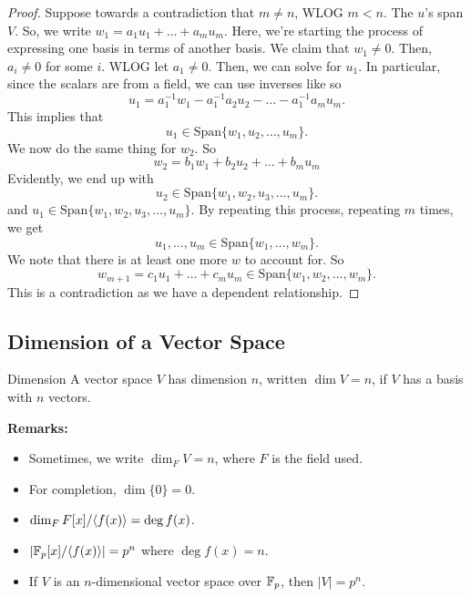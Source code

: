 \documentclass[letterpaper]{article}
\begin{document}
\begin{mdframed}[]
    \begin{proof}
        Suppose towards a contradiction that $m \neq n$, WLOG $m < n$. The $u$'s span $V$. So, we write $w_1 = a_1 u_1 + \dots + a_m u_m$. Here, we're starting the process of expressing one basis in terms of another basis. We claim that $w_1 \neq 0$. Then, $a_i \neq 0$ for some $i$. WLOG let $a_1 \neq 0$. Then, we can solve for $u_1$. In particular, since the scalars are from a field, we can use inverses like so 
        \[u_1 = a_{1}^{-1} w_1 - a_{1}^{-1} a_2 u_2 - \dots - a_{1}^{-1} a_m u_m.\]
        This implies that 
        \[u_1 \in \text{Span}\{w_1, u_2, \dots, u_m\}.\]
        We now do the same thing for $w_2$. So 
        \[w_2 = b_1 w_1 + b_2 u_2 + \dots + b_m u_m\]
        Evidently, we end up with 
        \[u_2 \in \text{Span}\{w_1, w_2, u_3, \dots, u_m\}.\]
        and $u_1 \in \text{Span}\{w_1, w_2, u_3, \dots, u_m\}$. By repeating this process, repeating $m$ times, we get 
        \[u_1, \dots, u_m \in \text{Span}\{w_1, \dots, w_m\}.\]
        We note that there is at least one more $w$ to account for. So 
        \[w_{m + 1} = c_1 u_1 + \dots + c_m u_m \in \text{Span}\{w_1, w_2, \dots, w_m\}.\]
        This is a contradiction as we have a dependent relationship. 
    \end{proof}
\end{mdframed}


\subsection{Dimension of a Vector Space}
\begin{definition}{Dimension}{}
    A vector space $V$ has dimension $n$, written $\dim V = n$, if $V$ has a basis with $n$ vectors.
\end{definition}
\textbf{Remarks:} 
\begin{itemize}
    \item Sometimes, we write $\dim_{F} V = n$, where $F$ is the field used.
    \item For completion, $\dim \{0\} = 0$.
    \item $\dim_{F} F[x] / \langle f(x) \rangle = \deg f(x)$.  
    \item $\left| \mathbb{F}_p [x] / \langle f(x) \rangle \right| = p^n$ where $\deg f(x) = n$. 
    \item If $V$ is an $n$-dimensional vector space over $\mathbb{F}_p$, then $|V| = p^n$. 
\end{itemize}
\end{document}

